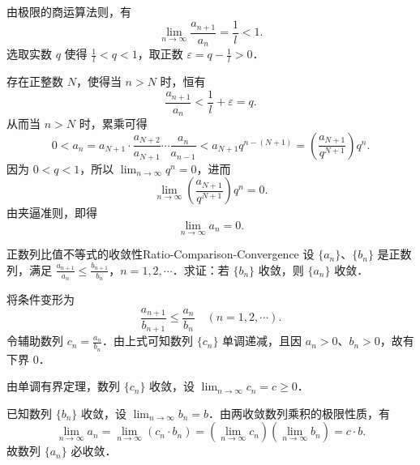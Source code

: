 \begin{myproof}
    由极限的商运算法则，有
    \begin{equation}
        \lim_{n\to\infty} \frac{a_{n+1}}{a_n} = \frac{1}{l} < 1.
    \end{equation}
    选取实数 $q$ 使得 $\frac{1}{l} < q < 1$，取正数 $\varepsilon = q - \frac{1}{l} > 0$．

    存在正整数 $N$，使得当 $n > N$ 时，恒有
    \begin{equation}
        \frac{a_{n+1}}{a_n} < \frac{1}{l} + \varepsilon = q.
    \end{equation}
    从而当 $n > N$ 时，累乘可得
    \begin{equation}
        0 < a_n = a_{N+1} \cdot \frac{a_{N+2}}{a_{N+1}} \cdots \frac{a_n}{a_{n-1}} < a_{N+1} q^{n - (N+1)} = \left( \frac{a_{N+1}}{q^{N+1}} \right) q^n.
    \end{equation}
    因为 $0 < q < 1$，所以 $\lim_{n\to\infty} q^n = 0$，进而
    \begin{equation}
        \lim_{n\to\infty} \left( \frac{a_{N+1}}{q^{N+1}} \right) q^n = 0.
    \end{equation}
    由夹逼准则，即得
    \begin{equation}
        \lim_{n\to\infty} a_n = 0.
    \end{equation}
\end{myproof}

\begin{problem}{正数列比值不等式的收敛性}{Ratio-Comparison-Convergence}
    设 $\{a_n\}$、$\{b_n\}$ 是正数列，满足 $\frac{a_{n+1}}{a_n} \leqslant \frac{b_{n+1}}{b_n}$，$n = 1, 2, \cdots$．求证：若 $\{b_n\}$ 收敛，则 $\{a_n\}$ 收敛．
\end{problem}

\begin{myproof}
    将条件变形为
    \begin{equation}
        \frac{a_{n+1}}{b_{n+1}} \leqslant \frac{a_n}{b_n} \quad (n = 1, 2, \cdots).
    \end{equation}
    令辅助数列 $c_n = \frac{a_n}{b_n}$．由上式可知数列 $\{c_n\}$ 单调递减，且因 $a_n > 0$、$b_n > 0$，故有下界 $0$．

    由单调有界定理，数列 $\{c_n\}$ 收敛，设 $\lim_{n\to\infty} c_n = c \geqslant 0$．

    已知数列 $\{b_n\}$ 收敛，设 $\lim_{n\to\infty} b_n = b$．由两收敛数列乘积的极限性质，有
    \begin{equation}
        \lim_{n\to\infty} a_n = \lim_{n\to\infty} (c_n \cdot b_n) = \left( \lim_{n\to\infty} c_n \right) \left( \lim_{n\to\infty} b_n \right) = c \cdot b.
    \end{equation}
    故数列 $\{a_n\}$ 必收敛．
\end{myproof}

